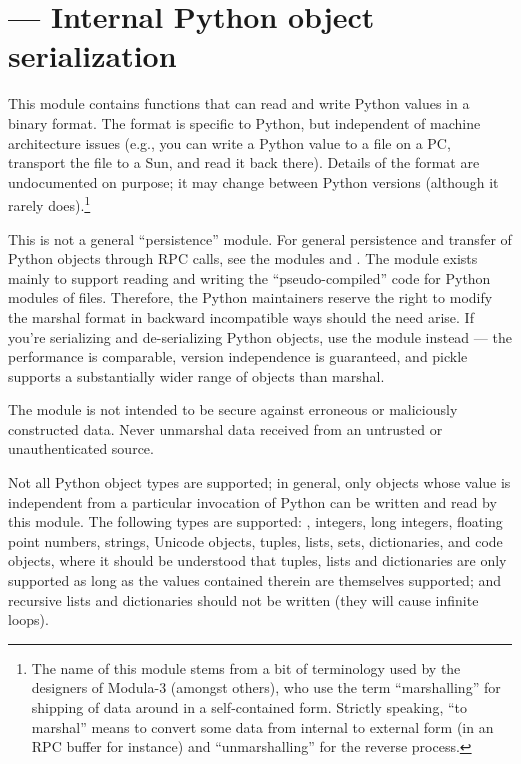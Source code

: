 \section{ ---
         Internal Python object serialization}



This module contains functions that can read and write Python
values in a binary format.  The format is specific to Python, but
independent of machine architecture issues (e.g., you can write a
Python value to a file on a PC, transport the file to a Sun, and read
it back there).  Details of the format are undocumented on purpose;
it may change between Python versions (although it rarely
does).\footnote{The name of this module stems from a bit of
  terminology used by the designers of Modula-3 (amongst others), who
  use the term ``marshalling'' for shipping of data around in a
  self-contained form. Strictly speaking, ``to marshal'' means to
  convert some data from internal to external form (in an RPC buffer for
  instance) and ``unmarshalling'' for the reverse process.}

This is not a general ``persistence'' module.  For general persistence
and transfer of Python objects through RPC calls, see the modules
 and .  The  module exists
mainly to support reading and writing the ``pseudo-compiled'' code for
Python modules of  files.  Therefore, the Python
maintainers reserve the right to modify the marshal format in backward
incompatible ways should the need arise.  If you're serializing and
de-serializing Python objects, use the  module instead
 --- the performance is comparable, version independence is guaranteed,
and pickle supports a substantially wider range of objects than marshal.

\begin{notice}[warning]
The  module is not intended to be secure against
erroneous or maliciously constructed data.  Never unmarshal data
received from an untrusted or unauthenticated source.
\end{notice}

Not all Python object types are supported; in general, only objects
whose value is independent from a particular invocation of Python can
be written and read by this module.  The following types are supported:
, integers, long integers, floating point numbers,
strings, Unicode objects, tuples, lists, sets, dictionaries, and code
objects, where it should be understood that tuples, lists and
dictionaries are only supported as long as the values contained
therein are themselves supported; and recursive lists and dictionaries
should not be written (they will cause infinite loops).

